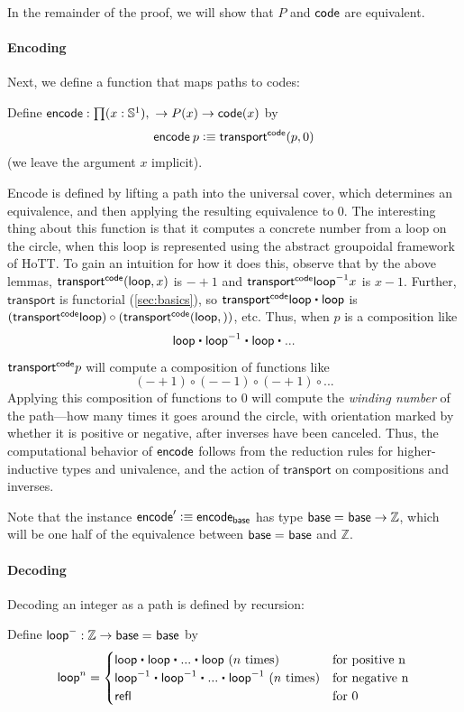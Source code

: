 In the remainder of the proof, we will show that $P$ and $\mathsf{code}$ are
equivalent.  

\paragraph{Encoding}

Next, we define a function \encode that maps paths to codes:
\begin{defn}
Define $\encode : \prd{x : \Sn ^1} \rightarrow P(x) \rightarrow  \code(x)$ by 
\[
\mathsf{encode} \: p \vcentcolon\equiv \mathsf{transport}^{\mathsf{code}}(p,0)
\]
(we leave the argument $x$ implicit).  
\end{defn}
Encode is defined by lifting a path into the universal cover, which
determines an equivalence, and then applying the resulting equivalence
to $0$.  
The interesting thing about this function is that it computes a concrete
number from a loop on the circle, when this loop is represented using
the abstract groupoidal framework of HoTT.  To gain an
intuition for how it does this, observe that by the above lemmas,
$\mathsf{transport}^{\mathsf{code}}(\mathsf{loop},x)$ is $-+1$ and $\mathsf{transport}^{\mathsf{code}} {\mathord{{\mathsf{loop}}^{-1}}} x$ is $x - 1$.  Further, $\mathsf{transport}$ is functorial
(\autoref{sec:basics}), so $\transfibf{\code} {\lloop \ct \lloop}$ is
$(\mathsf{transport}^{\mathsf{code}} \mathsf{loop}) \circ (\mathsf{transport}^{\mathsf{code}}(\mathsf{loop},))$, etc.  Thus, when $p$ is a
composition like 
\[
\lloop \ct \opp \lloop \ct \lloop \ct ...
\]
$\mathsf{transport}^{\mathsf{code}}{p}$ will compute a composition of functions like
\[
(- + 1) \circ (- -1) \circ (- + 1) \circ ... 
\]
Applying this composition of functions to 0 will compute the
\emph{winding number} of the path---how many times it goes around the
circle, with orientation marked by whether it is positive or negative,
after inverses have been canceled.  Thus, the computational behavior of
$\mathsf{encode}$ follows from the reduction rules for higher-inductive types and
univalence, and the action of $\mathsf{transport}$ on compositions and inverses.

Note that the instance $\mathsf{encode}' \vcentcolon\equiv \mathsf{encode}_{\mathsf{base}}$ has type 
$\mathsf{base} =_{} \mathsf{base} \rightarrow \mathbb{Z}$, which will be one half of the
equivalence between $\mathsf{base} =_{} \mathsf{base}$ and $\mathbb{Z}$.  

\paragraph{Decoding}  

Decoding an integer as a path is defined by recursion:

\begin{defn}
Define $\mathsf{loop}^- : \mathbb{Z} \rightarrow \mathsf{base} =_{} \mathsf{base}$ by 
\[
\lloop^n = \begin{cases} \lloop \ct \lloop \ct ... \ct \lloop \text{ ($n$ times) } & \text{for positive n} \\
 \opp \lloop \ct \opp \lloop \ct ... \ct \opp \lloop \text{ ($n$ times)} & \text{for negative n} \\
  \refl{} & \text{for 0}  
\end{cases}
\]
\end{defn}

